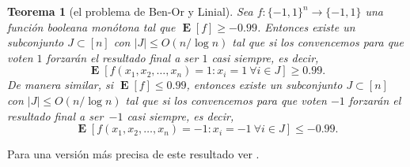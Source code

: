\documentclass[autocontact]{gaceta}
\newtheorem{theorem}{Teorema}
\DeclareMathOperator{\EE}{\mathbf{E}}
\begin{document}
\begin{theorem}[el problema de Ben-Or y Linial]\label{thm:BenOr-Linial}
Sea $f:\{-1,1\}^n\to\{-1,1\}$ una función booleana monótona tal que $\EE[f]\geq -0.99$. Entonces existe un subconjunto $J\subset [n]$ con $|J|\leq O(n/\log n)$ tal que si los \emph{convencemos para que voten} $1$ forzarán el resultado final a ser $1$ casi siempre, es decir,
\[
\EE[f(x_1,x_2,\dots,x_n)= 1: x_i= 1 \ \forall i\in J] \geq 0.99.
\]
De manera similar, si $\EE[f]\leq 0.99$, entonces existe un subconjunto $J\subset [n]$ con $|J|\leq O(n/\log n)$ tal que si los \emph{convencemos para que voten} $-1$ forzarán el resultado final a ser~$-1$ casi siempre, es decir,
\[
\EE[f(x_1,x_2,\dots,x_n)=-1: x_i=-1 \ \forall i\in J] \leq -0.99.
\]
\end{theorem}

Para una versión más precisa de este resultado ver \cite[ejercicio 9.27]{O'Do21}.
\end{document}
